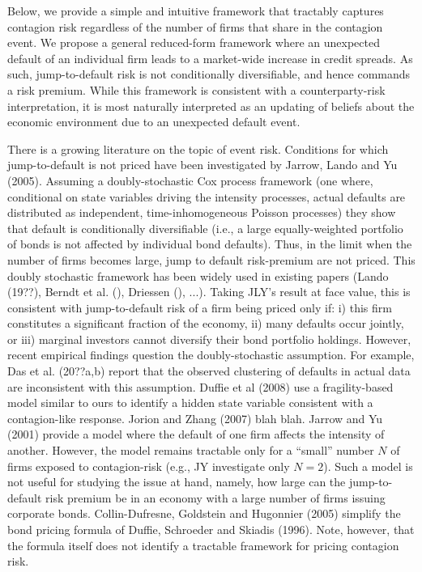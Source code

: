\documentclass[titlepage,11pt]{article}
\begin{document}
Below, we provide a simple and intuitive framework that tractably captures
contagion risk regardless of the number of firms that share in the
contagion event. We propose a general reduced-form framework where an unexpected default of an
individual firm leads to a market-wide increase in credit spreads.  As such,
jump-to-default risk is not conditionally diversifiable, and hence commands a risk
premium.  While this framework is consistent with a counterparty-risk interpretation, it is most
naturally interpreted as an updating of beliefs about the economic environment due to
an unexpected default event.

There is a growing literature on the topic of event risk.
Conditions for which jump-to-default is not priced have
been investigated by Jarrow, Lando and Yu (2005).  Assuming a
doubly-stochastic Cox process framework (one where, conditional on
state variables driving the intensity processes, actual defaults are distributed as
independent, time-inhomogeneous Poisson processes) they show that default is
conditionally diversifiable (i.e., a large equally-weighted
portfolio of bonds is not affected by individual bond defaults). Thus,
in the limit when the number of firms becomes large,
jump to default risk-premium are not priced. This doubly
stochastic framework has been widely used in existing papers (Lando
(19??), Berndt et al. (), Driessen (), ...). Taking JLY's result at
face value, this is consistent with jump-to-default risk of a firm being
priced only if: i) this firm constitutes a significant fraction of the economy, ii) many
defaults occur jointly, or iii) marginal investors cannot diversify
their bond portfolio holdings. However, recent empirical findings question
the doubly-stochastic assumption.  For example, Das et al. (20??a,b)
report that the observed clustering of defaults in actual data are inconsistent
with this assumption.  Duffie et al (2008) use a fragility-based model similar to
ours to identify a hidden state variable consistent with a contagion-like response.
Jorion and Zhang (2007) blah blah.  Jarrow and Yu (2001) provide a model where
the default of one firm affects the intensity of another.  However, the model remains
tractable only for a ``small'' number $N$ of firms exposed to contagion-risk (e.g.,
JY investigate only $N=2$).  Such a model is not useful for studying the issue
at hand, namely, how large can the jump-to-default risk premium
be in an economy with a large number of firms issuing corporate bonds. Collin-Dufresne,
Goldstein and Hugonnier (2005) simplify the bond pricing formula of Duffie, Schroeder
and Skiadis (1996).  Note, however, that the formula itself does not identify a tractable framework for
pricing contagion risk.
\end{document}
